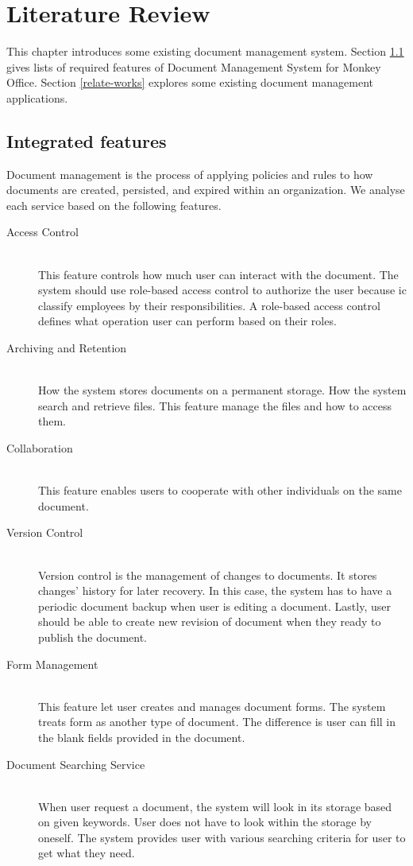 \chapter{Literature Review}
This chapter introduces some existing document management system.
Section \ref{dms-features} gives lists of required features of Document Management System for Monkey Office.
Section \ref{relate-works} explores some existing document management applications.

\section{Integrated features} \label{dms-features}
Document management is the process of applying policies and rules to how documents are created, persisted, and expired within an organization.
We analyse each service based on the following features.

\begin{description}
\item[Access Control] \hfill \\
This feature controls how much user can interact with the document.
The system should use role-based access control to authorize the user because \gls{ic} classify employees by their responsibilities.
A role-based access control defines what operation user can perform based on their roles.

\item[Archiving and Retention] \hfill \\
How the system stores documents on a permanent storage.
How the system search and retrieve files.
This feature manage the files and how to access them.

\item[Collaboration] \hfill \\
This feature enables users to cooperate with other individuals on the same document. 


\item[Version Control] \hfill \\
Version control is the management of changes to documents.
It stores changes' history for later recovery.
In this case, the system has to have a periodic document backup when user is editing a document.
Lastly, user should be able to create new revision of document when they ready to publish the document.

\item[Form Management] \hfill \\
This feature let user creates and manages document forms.
The system treats form as another type of document.
The difference is user can fill in the blank fields provided in the document.

\item[Document Searching Service] \hfill \\
When user request a document, the system will look in its storage based on given keywords.
User does not have to look within the storage by oneself.
The system provides user with various searching criteria for user to get what they need.
\end{description}


